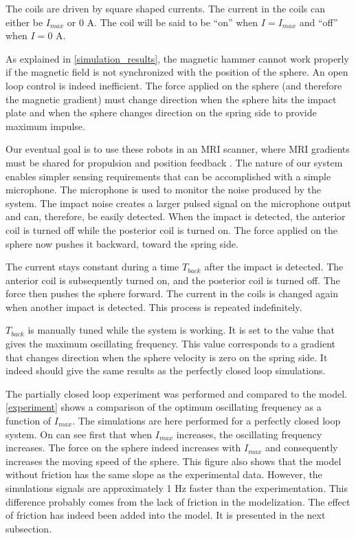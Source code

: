 \documentclass[letterpaper, 10 pt, conference]{ieeeconf}  %
\begin{document}
The coils are driven by square shaped currents. The current in the coils can either be $I_{max}$ or 0 A. The coil will be said to be “on” when $I=I_{max}$ and “off” when $I=0$ A.\par
As explained in \cref{simulation_results}, the magnetic hammer cannot work properly if the magnetic field is not synchronized with the position of the sphere. An open loop control is indeed inefficient. The force applied on the sphere (and therefore the magnetic gradient) must change direction when the sphere hits the impact plate and when the sphere changes direction on the spring side to provide maximum impulse.\par
Our eventual goal is to use these robots in an MRI scanner, where MRI gradients must be shared for propulsion and position feedback \cite{578}. The nature of our system enables simpler sensing requirements that can be accomplished with a simple microphone. The microphone is used to monitor the noise produced by the system. The impact noise creates a larger pulsed signal on the microphone output and can, therefore, be easily detected. When the impact is detected, the anterior coil is turned off while the posterior coil is turned on. The force applied on the sphere now pushes it backward, toward the spring side.\par
The current stays constant during a time $T_{back}$ after the impact is detected. The anterior coil is subsequently turned on, and the posterior coil is turned off. The force then pushes the sphere forward. The current in the coils is changed again when another impact is detected. This process is repeated indefinitely.\par
$T_{back}$ is manually tuned while the system is working. It is set to the value that gives the maximum oscillating frequency. This value corresponds to a gradient that changes direction when the sphere velocity is zero on the spring side. It indeed should give the same results as the perfectly closed loop simulations.\par
The partially closed loop experiment was performed and compared to the model. \cref{experiment} shows a comparison of the optimum oscillating frequency as a function of $I_{max}$. The simulations are here performed for a perfectly closed loop system. On can see first that when $I_{max}$ increases, the oscillating frequency increases. The force on the sphere indeed increases with $I_{max}$ and consequently increases the moving speed of the sphere.
This figure also shows that the model without friction has the same slope as the experimental data. However, the simulations signals are approximately 1 Hz faster than the experimentation. This difference probably comes from the lack of friction in the modelization. The effect of friction has indeed been added into the model. It is presented in the next subsection.
\end{document}
